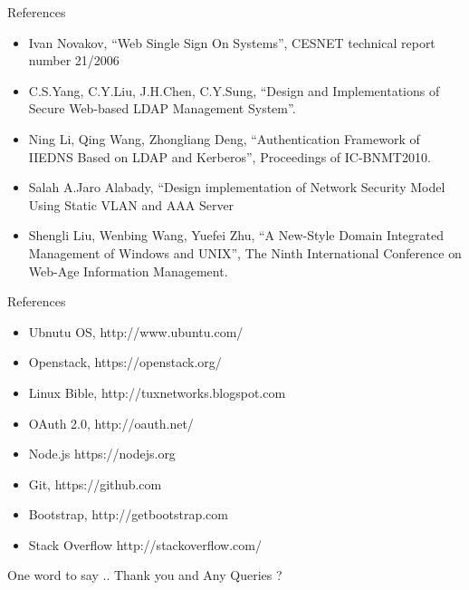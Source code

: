 \documentclass[xcolor=dvipsnames]{beamer}
\begin{document}
\begin{frame}{References}
\small
\begin{itemize}
\item Ivan Novakov, ``Web Single Sign On Systems'', CESNET technical report number 21/2006
\item C.S.Yang, C.Y.Liu, J.H.Chen, C.Y.Sung, ``Design and Implementations of Secure Web-based LDAP Management System''.
\item Ning Li, Qing Wang, Zhongliang Deng, ``Authentication Framework of IIEDNS Based on LDAP and Kerberos'', Proceedings of IC-BNMT2010.
\item Salah A.Jaro Alabady, ``Design implementation of Network Security Model Using Static VLAN and AAA Server
\item Shengli Liu, Wenbing Wang, Yuefei Zhu, ``A New-Style Domain Integrated Management of Windows and UNIX'', The Ninth International Conference on Web-Age Information Management.
\end{itemize}
\end{frame}

\begin{frame}{References}
\small
\begin{itemize}
\item Ubnutu OS, http://www.ubuntu.com/
\item Openstack, https://openstack.org/
\item Linux Bible, http://tuxnetworks.blogspot.com
\item OAuth 2.0, http://oauth.net/
\item Node.js https://nodejs.org
\item Git, https://github.com
\item Bootstrap, http://getbootstrap.com 
\item Stack Overflow http://stackoverflow.com/
\end{itemize}
\end{frame}

\begin{frame}{One word to say ..}
Thank you and Any Queries ?
\end{frame}
\end{document}
